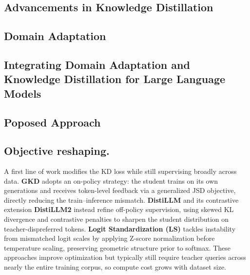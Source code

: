 \subsection{Advancements in Knowledge Distillation}
\label{subsec: advance_kd}

\subsection{Domain Adaptation}
\label{subsec: da}

\subsection{Integrating Domain Adaptation and Knowledge Distillation for Large Language Models}
\label{subsec: int}

\subsection{Poposed Approach}
\label{subsec: claim}



\subsection{Objective reshaping.}
A first line of work modifies the KD loss while still supervising broadly across data. \textbf{GKD} \cite{gkd} adopts an on-policy strategy: the student trains on its own generations and receives token-level feedback via a generalized JSD objective, directly reducing the train–inference mismatch. \textbf{DistiLLM} \cite{distillm} and its contrastive extension \textbf{DistiLLM2} \cite{ko2025distillm} instead refine off-policy supervision, using skewed KL divergence and contrastive penalties to sharpen the student distribution on teacher-dispreferred tokens. \textbf{Logit Standardization (LS)} \cite{ls} tackles instability from mismatched logit scales by applying Z-score normalization before temperature scaling, preserving geometric structure prior to softmax. These approaches improve optimization but typically still require teacher queries across nearly the entire training corpus, so compute cost grows with dataset size.

